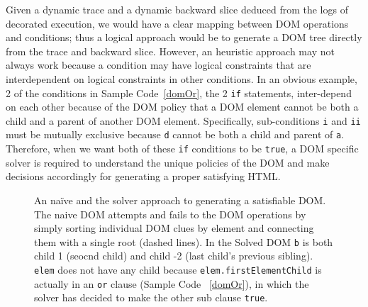 Given a dynamic trace and a dynamic backward slice deduced from the logs of decorated execution, we would have a clear mapping between DOM operations and conditions; thus a logical approach would be to generate a DOM tree directly from the trace and backward slice.  
However, an heuristic approach may not always work because a condition may have logical constraints that are interdependent on logical constraints in other conditions.  
In an obvious example, 2 of the conditions in Sample Code~\ref{domOr}, the 2 {\tt if} statements, inter-depend on each other because of the DOM policy that a DOM element cannot be both a child and a parent of another DOM element.  
Specifically, sub-conditions {\tt i} and {\tt ii} must be mutually exclusive because {\tt d} cannot be both a child and parent of {\tt a}.
Therefore, when we want both of these {\tt if} conditions to be {\tt true}, a DOM specific solver is required to understand the unique policies of the DOM and make decisions accordingly for generating a proper satisfying HTML.


\begin{figure}[ht]
\centerline{}
\caption[Naive vs. Solved DOM trees]{An na\"{i}ve and the solver approach to generating a satisfiable DOM.  The naive DOM attempts and fails to the DOM operations by simply sorting individual DOM clues by element and connecting them with a single root (dashed lines).  In the Solved DOM {\tt b} is both child 1 (seocnd child) and child -2 (last child's previous sibling).  {\tt elem} does not have any child because {\tt elem.firstElementChild} is actually in an {\tt or} clause (Sample Code ~\ref{domOr}), in which the solver has decided to make the other sub clause {\tt true}.}
\label{trees}
\end{figure}


